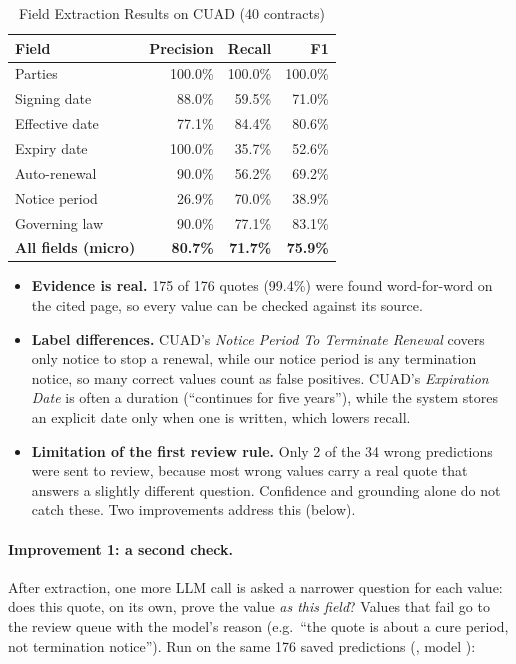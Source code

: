 \begin{table}[H]\centering
\caption{Field Extraction Results on CUAD (40 contracts)}\label{tab:ev-extract}
\begin{tabular}{|l|r|r|r|}\hline
\textbf{Field} & \textbf{Precision} & \textbf{Recall} & \textbf{F1} \\ \hline
Parties & 100.0\% & 100.0\% & 100.0\% \\ \hline
Signing date & 88.0\% & 59.5\% & 71.0\% \\ \hline
Effective date & 77.1\% & 84.4\% & 80.6\% \\ \hline
Expiry date & 100.0\% & 35.7\% & 52.6\% \\ \hline
Auto-renewal & 90.0\% & 56.2\% & 69.2\% \\ \hline
Notice period & 26.9\% & 70.0\% & 38.9\% \\ \hline
Governing law & 90.0\% & 77.1\% & 83.1\% \\ \hline
\textbf{All fields (micro)} & \textbf{80.7\%} & \textbf{71.7\%} & \textbf{75.9\%} \\ \hline
\end{tabular}
\end{table}
\begin{itemize}
\item \textbf{Evidence is real.} 175 of 176 quotes (99.4\%) were found word-for-word on the cited page,
so every value can be checked against its source.
\item \textbf{Label differences.} CUAD's \emph{Notice Period To Terminate Renewal} covers only notice to
stop a renewal, while our notice period is any termination notice, so many correct values count as false
positives. CUAD's \emph{Expiration Date} is often a duration (``continues for five years''), while the
system stores an explicit date only when one is written, which lowers recall.
\item \textbf{Limitation of the first review rule.} Only 2 of the 34 wrong predictions were sent to review,
because most wrong values carry a real quote that answers a slightly different question. Confidence and
grounding alone do not catch these. Two improvements address this (below).
\end{itemize}

\paragraph*{Improvement 1: a second check.} After extraction, one more LLM call is asked a narrower question for
each value: does this quote, on its own, prove the value \emph{as this field}? Values that fail go to the review
queue with the model's reason (e.g.\ ``the quote is about a cure period, not termination notice''). Run on the
same 176 saved predictions (, model ):


